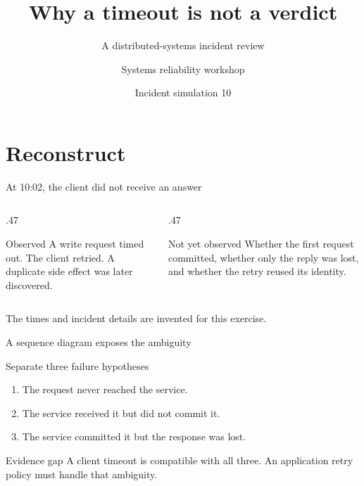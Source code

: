 \documentclass[10pt,aspectratio=169]{beamer}
\title{Why a timeout is not a verdict}
\subtitle{A distributed-systems incident review}
\author{Systems reliability workshop}
\date{Incident simulation 10}
\begin{document}
\begin{frame}[plain]\titlepage\end{frame}
\section{Reconstruct}
\begin{frame}{At 10:02, the client did not receive an answer}
\begin{columns}[T]
\begin{column}{.47\textwidth}\begin{block}{Observed}
A write request timed out. The client retried. A duplicate side effect was later discovered.
\end{block}\end{column}
\begin{column}{.47\textwidth}\begin{alertblock}{Not yet observed}
Whether the first request committed, whether only the reply was lost, and whether the retry reused its identity.
\end{alertblock}\end{column}
\end{columns}
\medskip
The times and incident details are invented for this exercise.
\end{frame}
\begin{frame}{A sequence diagram exposes the ambiguity}
\centering
{}
\end{frame}
\begin{frame}{Separate three failure hypotheses}
\begin{enumerate}[<+->]
\item The request never reached the service.
\item The service received it but did not commit it.
\item The service committed it but the response was lost.
\end{enumerate}
\begin{block}{Evidence gap}
A client timeout is compatible with all three. An application retry policy must handle that ambiguity.
\end{block}
\end{frame}
\end{document}
